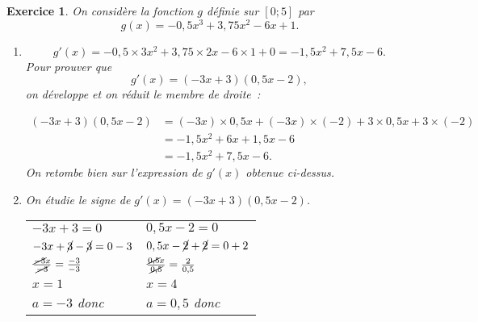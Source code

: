 \documentclass[10pt]{article}
\newtheorem{exo}{Exercice}
\begin{document}
\begin{exo}

On considère la fonction $g$ définie sur $\left[0;5\right]$ par \[g(x)=-0,5x^3+3,75x^2-6x+1.\]

\begin{enumerate}
\item \[g'(x)=-0,5\times 3x^2+3,75\times 2x-6\times 1+0=-1,5x^2+7,5x-6.\] Pour prouver que
\[g'(x)=(-3x+3)(0,5x-2),\] on développe et on réduit le membre de droite~:

\begin{align*}
(-3x+3)(0,5x-2)&=(-3x)\times 0,5x+(-3x)\times (-2)+3\times 0,5 x+3\times (-2)\\
&=-1,5x^2+6x+1,5x-6\\
&=-1,5x^2+7,5x-6.\end{align*} On retombe bien sur l'expression de $g'(x)$ obtenue ci-dessus.
\item On étudie le signe de $g'(x)=(-3x+3)(0,5x-2).$

\medskip

{\setlength{\arrayrulewidth}{2pt}
\begin{center}
\begin{tabular}{l|l}
$-3x+3=0$&$0,5x-2=0$\\
$-3x+\cancel{3}-\cancel{3}=0-3$&$0,5x-\cancel{2}+\cancel{2}=0+2$\\
$\frac{\cancel{-3}x}{\cancel{-3}}=\frac{-3}{-3}$&$\frac{\cancel{0,5}x}{\cancel{0,5}}=\frac{2}{0,5}$\\
$x=1$&$x=4$ \\
$a=-3$ donc \fbox{$+~\upphi~-$}&$a=0,5$ donc \fbox{$-~\upphi~+$}
\end{tabular}
\end{center}}

\medskip


\begin{center}
\end{center}



\end{enumerate}

\end{exo}
\end{document}
